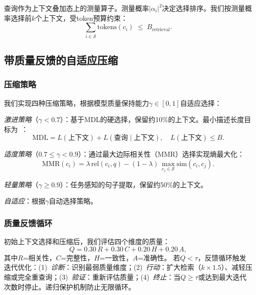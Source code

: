 \documentclass[a4paper,11pt]{ctexart}
\newcommand{\abs}[1]{\left|#1\right|}
\begin{document}
查询作为上下文叠加态上的测量算子。测量概率$\abs{\alpha_i}^{2}$决定选择排序。我们按测量概率选择前$k$个上下文，受token预算约束：
\begin{equation}
  \sum_{i \in \mathcal{S}}
    \mathrm{tokens}(c_i) \;\leq\; B_{\mathrm{retrieval}}.
  \label{eq:budget-constraint}
\end{equation}

\subsection{带质量反馈的自适应压缩}
\label{sec:compression}

\subsubsection{压缩策略}

我们实现四种压缩策略，根据模型质量保持能力$\gamma \in [0,1]$自适应选择：

\emph{激进策略}（$\gamma < 0.7$）：基于MDL的硬选择，保留约10\%的上下文。最小描述长度目标为~\cite{grunwald2007mdl}：
\begin{equation}
  \mathrm{MDL} = L(\text{上下文}) + L(\text{查询} \mid \text{上下文}),
  \quad L(\text{上下文}) \leq B.
  \label{eq:mdl}
\end{equation}

\emph{适度策略}（$0.7 \leq \gamma < 0.9$）：通过最大边际相关性（MMR）选择实现熵最大化：
\begin{equation}
  \mathrm{MMR}(c_i) =
    \lambda\, \mathrm{rel}(c_i, q)
    - (1-\lambda)\,
      \max_{c_j \in \mathcal{S}} \mathrm{sim}(c_i, c_j).
  \label{eq:mmr}
\end{equation}

\emph{轻量策略}（$\gamma \geq 0.9$）：任务感知的句子提取，保留约50\%的上下文。

\emph{自适应}：根据$\gamma$自动选择策略。

\subsubsection{质量反馈循环}

初始上下文选择和压缩后，我们评估四个维度的质量：
\begin{equation}
  Q = 0.30\,R + 0.30\,C + 0.20\,H + 0.20\,A,
  \label{eq:quality}
\end{equation}
其中$R$=相关性，$C$=完整性，$H$=一致性，$A$=准确性。
若$Q < \tau$，反馈循环触发迭代优化：(1)~\emph{诊断}：识别最弱质量维度；(2)~\emph{行动}：扩大检索（$k \times 1.5$）、减轻压缩或完全重查询；(3)~\emph{验证}：重新评估质量；(4)~\emph{终止}：当$Q \geq \tau$或达到最大迭代次数时停止。递归保护机制防止无限循环。
\end{document}
